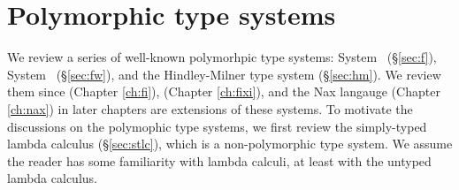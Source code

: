 \chapter{Polymorphic type systems}\label{ch:poly}
We review a series of well-known polymorhpic type systems:
System \F\ (\S\ref{sec:f}), System \Fw\ (\S\ref{sec:fw}),
and the Hindley-Milner type system (\S\ref{sec:hm}).
We review them since \Fi (Chapter \ref{ch:fi}), \Fixi (Chapter \ref{ch:fixi}),
and the Nax langauge (Chapter \ref{ch:nax}) in later chapters are
extensions of these systems.
To motivate the discussions on the polymophic type systems,
we first review the simply-typed lambda calculus (\S\ref{sec:stlc}),
which is a non-polymorphic type system. We assume the reader has some
familiarity with lambda calculi, at least with the untyped lambda calculus.


